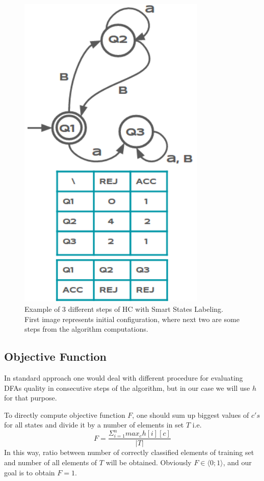\documentclass{mini}
\begin{document}
\begin{figure}[H]
\begin{minipage}{.3\textwidth}
  \includegraphics[width=0.8\textwidth]{./images/hc_example_3.png}
\caption{}
\label{fig:smart_state_example_3}
\end{minipage}
\label{fig:smart_state_example}
\caption{Example of 3 different steps of HC with Smart States Labeling. First image represents initial configuration, where next two are some steps from the algorithm computations.}
\end{figure}

\subsection{Objective Function} \label{subsec:obj_func}
In standard approach one would deal with different procedure for evaluating DFAs quality in consecutive steps of the algorithm, but in our case we will use $h$ for that purpose.

To directly compute objective function $F$, one should sum up biggest values of $c's$ for all states and divide it by a number of elements in set $T$ i.e.
\begin{equation}
F = \frac{\Sigma_{i=1}^{n} max_c h[i][c]}{|T|}
\end{equation}
In this way, ratio between number of correctly classified elements of training set and number of all elements of $T$ will be obtained. Obviously $F \in \langle 0 ; 1 \rangle$, and our goal is to obtain $F=1$.
\end{document}
